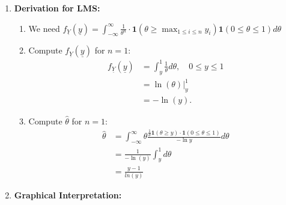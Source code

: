 \begin{example}
\begin{enumerate}
        \item \textbf{Derivation for LMS:}
        \begin{enumerate}
            \item We need $f_{\underline{Y}} (\underline{y}) = \int_{-\infty}^{\infty} \frac{1}{\theta^n} \cdot \mathbf{1}(\theta \geq \max_{1 \leq i \leq n} y_i) \mathbf{1} (0 \leq \theta \leq 1) d\theta $
            \item Compute \( f_{\underline{Y}} (\underline{y}) \) for \( n = 1 \):
            \begin{align*}
                f_{\underline{Y}} (\underline{y}) &= \int_y^1 \frac{1}{\theta} d\theta, \quad 0 \leq y \leq 1 \\
                &= \ln(\theta) \Big|_y^1 \\
                &= -\ln(y).
            \end{align*}

            \item Compute \( \hat{\theta} \) for \( n = 1 \):
            \begin{align*}
                \hat{\theta} &= \int_{-\infty}^{\infty} \theta \frac{\frac{1}{\theta} \mathbf{1}(\theta \geq y) \cdot \mathbf{1} (0 \leq \theta \leq 1)}{- \ln y} d\theta \\
                &= \frac{1}{-\ln(y)} \int_y^1 d\theta \\
                &= \frac{y-1}{ln(y)} 
            \end{align*}
        \end{enumerate}

        \item \textbf{Graphical Interpretation:}
    \end{enumerate}
\end{example}